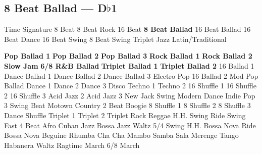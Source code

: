 \subsection{8 Beat Ballad --- D$\flat$1}
Time Signature
8 Beat
8 Beat Rock
16 Beat
\textbf{8 Beat Ballad}
16 Beat Ballad
16 Beat Dance
16 Beat Swing
8 Beat Swing
Triplet
Jazz
Latin/Traditional





























\textbf{Pop Ballad 1}
\textbf{Pop Ballad 2}
\textbf{Pop Ballad 3}
\textbf{Rock Ballad 1}
\textbf{Rock Ballad 2}
\textbf{Slow Jam}
\textbf{6/8 R\&B Ballad}
\textbf{Triplet Ballad 1}
\textbf{Triplet Ballad 2}
16 Ballad 1
Dance Ballad 1
Dance Ballad 2
Dance Ballad 3
Electro Pop
16 Ballad 2
Mod Pop Ballad
Dance 1
Dance 2
Dance 3
Disco
Techno 1
Techno 2
16 Shuffle 1
16 Shuffle 2
16 Shuffle 3
Acid Jazz 2
Acid Jazz 3
New Jack Swing
Modern Dance
Indie Pop 3
Swing Beat
Motown
Country 2 Beat
Boogie
8 Shuffle 1
8 Shuffle 2
8 Shuffle 3
Dance Shuffle
Triplet 1
Triplet 2
Triplet Rock
Reggae
H.H. Swing
Ride Swing
Fast 4 Beat
Afro Cuban
Jazz Bossa
Jazz Waltz
5/4 Swing
H.H. Bossa Nova
Ride Bossa Nova
Beguine
Rhumba
Cha Cha
Mambo
Samba
Sala
Merenge
Tango
Habanera
Waltz
Ragtime
March
6/8 March
